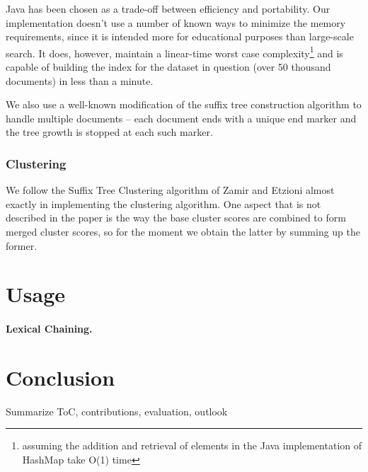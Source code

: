 \documentclass[11pt, a4paper, abstraction]{scrartcl}
\begin{document}
Java has been chosen as a trade-off between efficiency and portability. Our implementation doesn't use a number of known ways to minimize the memory requirements, since it is intended more for educational purposes than large-scale search. It does, however, maintain a linear-time worst case complexity\footnote{assuming the addition and retrieval of elements in the Java implementation of HashMap take O(1) time} and is capable of building the index for the dataset in question (over 50 thousand documents) in less than a minute.

We also use a well-known modification of the suffix tree construction algorithm to handle multiple documents -- each document ends with a unique end marker and the tree growth is stopped at each such marker.

\subsubsection{Clustering}
We follow the Suffix Tree Clustering algorithm of Zamir and Etzioni almost exactly in implementing the clustering algorithm. One aspect that is not described in the paper is the way the base cluster scores are combined to form merged cluster scores, so for the moment we obtain the latter by summing up the former.
 

\section{Usage}

\paragraph{Lexical Chaining.} 

% 
% 
% 
% 
% 
% 

\section{Conclusion}

Summarize ToC, contributions, evaluation, outlook
\end{document}
